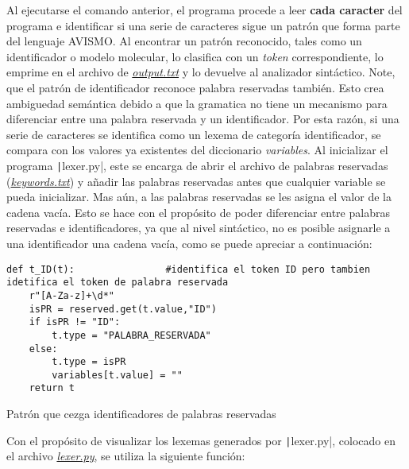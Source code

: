 Al ejecutarse el comando anterior, el programa procede a leer \textbf{cada caracter} del programa e identificar si una serie de caracteres sigue un patrón que forma parte del lenguaje AVISMO. Al encontrar un patrón reconocido, tales como un identificador o modelo molecular, lo clasifica con un \textit{token} correspondiente, lo emprime en el archivo de \href{https://github.com/aramis-matos/comp4999_compilers_project/blob/master/code/python_remake/output.txt}{\textit{output.txt}} y lo devuelve al analizador sintáctico. Note, que el patrón de identificador reconoce palabra reservadas también. Esto crea ambiguedad semántica debido a que la gramatica no tiene un mecanismo para diferenciar entre una palabra reservada y un identificador. Por esta razón, si una serie de caracteres se identifica como un lexema de categoría identificador, se compara con los valores ya existentes del diccionario \textit{variables}. Al inicializar el programa \texttt|lexer.py|, este se encarga de abrir el archivo de
palabras reservadas (\href{https://github.com/aramis-matos/comp4999_compilers_project/blob/master/code/python remake/keywords.txt}{\textit{keywords.txt}}) y añadir las palabras reservadas antes que cualquier variable se pueda inicializar. Mas aún, a las palabras reservadas se les asigna el valor de la cadena vacía. Esto se hace con el propósito de poder diferenciar entre palabras reservadas e identificadores, ya que al nivel sintáctico, no es posible asignarle a una identificador una cadena vacía, como se puede apreciar a continuación:
\begin{listing}[H]
\begin{verbatim}
def t_ID(t):                #identifica el token ID pero tambien idetifica el token de palabra reservada
    r"[A-Za-z]+\d*"
    isPR = reserved.get(t.value,"ID") 
    if isPR != "ID":
        t.type = "PALABRA_RESERVADA"
    else:
        t.type = isPR
        variables[t.value] = ""
    return t
\end{verbatim}
\caption{Patrón que cezga identificadores de palabras reservadas}
\label{lst: id}
\end{listing}
Con el propósito de visualizar los lexemas generados por \texttt|lexer.py|, colocado en el archivo \href{https://github.com/aramis-matos/comp4999_compilers_project/blob/master/code/python_remake/lexer.py}{\textit{lexer.py}}, se utiliza la siguiente función:
